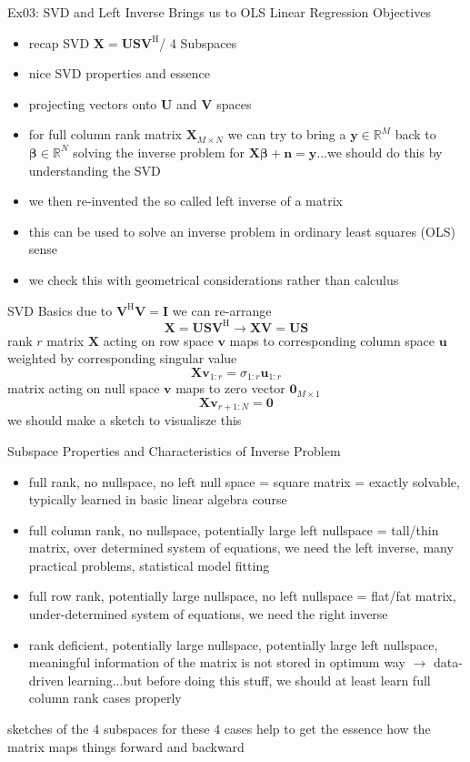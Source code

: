 \documentclass[mathserif, aspectratio=43]{intbeamer}
\begin{document}
\begin{frame}{Ex03: SVD and Left Inverse Brings us to OLS Linear Regression}
Objectives
\begin{itemize}
\item recap SVD $\bm{X} = \bm{U} \bm{S} \bm{V}^\mathrm{H}$/ 4 Subspaces
\item nice SVD properties and essence
\item projecting vectors onto $\bm{U}$ and $\bm{V}$ spaces
\item for full column rank matrix $\bm{X}_{M \times N}$ we can try to bring a $\bm{y}\in \mathbb{R}^M$ back to $\bm{\beta}\in \mathbb{R}^N$ solving the inverse problem for $\bm{X} \bm{\beta} + \bm{n} = \bm{y}$...we should do this by understanding the SVD
\item we then re-invented the so called left inverse of a matrix
\item this can be used to solve an inverse problem in ordinary least squares (OLS) sense
\item we check this with geometrical considerations rather than calculus
\end{itemize}
\end{frame}




\begin{frame}{SVD Basics}
due to $\bm{V}^\mathrm{H}\bm{V}=\bm{I}$ we can re-arrange
$$\bm{X} = \bm{U} \bm{S} \bm{V}^\mathrm{H} \rightarrow
\bm{X} \bm{V} = \bm{U} \bm{S}$$
rank $r$ matrix $\bm{X}$ acting on row space $\bm{v}$ maps to corresponding column space $\bm{u}$ weighted by corresponding singular value
$$\bm{X} \bm{v}_{1:r} = \sigma_{1:r} \bm{u}_{1:r}$$
matrix acting on null space $\bm{v}$ maps to zero vector $\bm{0}_{M \times 1}$
$$\bm{X} \bm{v}_{r+1:N} = \bm{0}$$
we should make a sketch to visualisze this
\end{frame}


\begin{frame}{Subspace Properties and Characteristics of Inverse Problem}

\begin{itemize}
\item full rank, no nullspace, no left null space = square matrix = exactly solvable, typically learned in basic linear algebra course
\item full column rank, no nullspace, potentially large left nullspace = tall/thin matrix, over determined system of equations, we need the left inverse, many practical problems, statistical model fitting
\item full row rank, potentially large nullspace, no left nullspace = flat/fat matrix, under-determined system of equations, we need the right inverse
\item rank deficient, potentially large nullspace, potentially large left nullspace, meaningful information of the matrix is not stored in optimum way $\rightarrow$ data-driven learning...but before doing this stuff, we should at least learn full column rank cases properly
\end{itemize}
sketches of the 4 subspaces for these 4 cases help to get the essence how the matrix maps things forward and backward
\end{frame}
\end{document}
